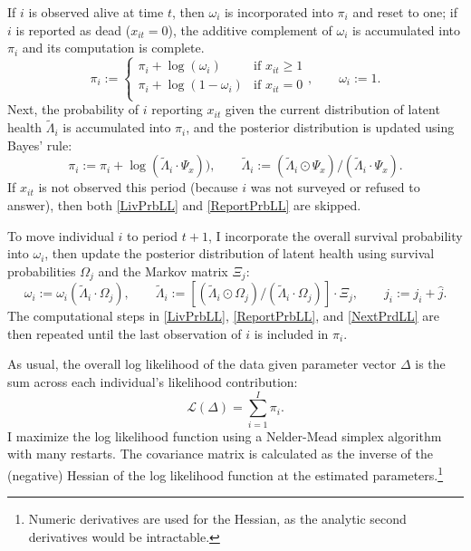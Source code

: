 \documentclass[12pt,pdftex,letterpaper]{article}
\newcommand{\Report}{x}
\newcommand{\Age}{j}
\newcommand{\AgeIncr}{\hat{\Age}}
\newcommand{\ParamVec}{\Delta}
\newcommand{\LivPrb}{\Omega}
\newcommand{\CumLivPrb}{\omega}
\newcommand{\TransPrb}{\Xi}
\newcommand{\ReportPrb}{\Psi}
\newcommand{\HealthDstnPcvd}{\widetilde{\Lambda}}
\newcommand{\LL}{\pi}
\begin{document}
If $i$ is observed alive at time $t$, then $\CumLivPrb_i$ is incorporated into $\LL_i$ and reset to one; if $i$ is reported as dead ($\Report_{it} = 0$), the additive complement of $\CumLivPrb_{i}$ is accumulated into $\LL_i$ and its computation is complete.
\begin{equation}\label{LivPrbLL}
\LL_i := \begin{cases}
\LL_{i} + \log(\CumLivPrb_i) & \text{if } \Report_{it} \geq 1 \\
\LL_{i} + \log(1 - \CumLivPrb_i) & \text{if } \Report_{it} = 0 \\
\end{cases}, \qquad \CumLivPrb_i := 1.
\end{equation}
Next, the probability of $i$ reporting $\Report_{it}$ given the current distribution of latent health $\HealthDstnPcvd_{i}$ is accumulated into $\LL_i$, and the posterior distribution is updated using Bayes' rule:
\begin{equation}\label{ReportPrbLL}
\LL_i := \LL_i + \log(\HealthDstnPcvd_{i} \cdot \ReportPrb_{\Report})), \qquad \HealthDstnPcvd_{i} := (\HealthDstnPcvd_{i} \odot \ReportPrb_{\Report}) / (\HealthDstnPcvd_{i} \cdot \ReportPrb_{\Report}).
\end{equation}
If $\Report_{it}$ is not observed this period (because $i$ was not surveyed or refused to answer), then both \eqref{LivPrbLL} and \eqref{ReportPrbLL} are skipped.

To move individual $i$ to period $t+1$, I incorporate the overall survival probability into $\CumLivPrb_{i}$, then update the posterior distribution of latent health using survival probabilities $\LivPrb_\Age$ and the Markov matrix $\TransPrb_\Age$:
\begin{equation}\label{NextPrdLL}
\CumLivPrb_i := \CumLivPrb_i (\HealthDstnPcvd_{i} \cdot \LivPrb_\Age), \qquad \HealthDstnPcvd_{i} := \left[ (\HealthDstnPcvd_{i} \odot \LivPrb_\Age) / (\HealthDstnPcvd_{i} \cdot \LivPrb_\Age) \right] \cdot \TransPrb_\Age, \qquad \Age_i := \Age_i + \AgeIncr.
\end{equation}
The computational steps in \eqref{LivPrbLL}, \eqref{ReportPrbLL}, and \eqref{NextPrdLL} are then repeated until the last observation of $i$ is included in $\LL_i$.

As usual, the overall log likelihood of the data given parameter vector $\ParamVec$ is the sum across each individual's likelihood contribution:
\begin{equation}
\mathcal{L}(\ParamVec) = \sum_{i=1}^{I} \LL_i.
\end{equation}
I maximize the log likelihood function using a Nelder-Mead simplex algorithm with many restarts.  The covariance matrix is calculated as the inverse of the (negative) Hessian of the log likelihood function at the estimated parameters.\footnote{Numeric derivatives are used for the Hessian, as the analytic second derivatives would be intractable.} 
\end{document}
